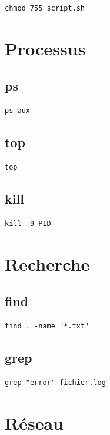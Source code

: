 \documentclass[12pt,a4paper]{report}
\begin{document}
\begin{lstlisting}
chmod 755 script.sh
\end{lstlisting}

\section{Processus}

\subsection*{ps}

\begin{lstlisting}
ps aux
\end{lstlisting}

\subsection*{top}

\begin{lstlisting}
top
\end{lstlisting}

\subsection*{kill}

\begin{lstlisting}
kill -9 PID
\end{lstlisting}

\section{Recherche}

\subsection*{find}

\begin{lstlisting}
find . -name "*.txt"
\end{lstlisting}

\subsection*{grep}

\begin{lstlisting}
grep "error" fichier.log
\end{lstlisting}

\section{Réseau}
\end{document}
